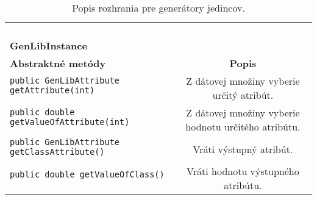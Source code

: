 \begin{table}
\begin{tabular}{|l|c|}
& \\ 
& \\ 
& \\ 
& \\ 
\hline
\hline
\textbf{GenLibInstance} & \\
\hline\hline
\textbf{Abstraktné metódy} & \textbf{Popis} \\
\hline
\verb|public GenLibAttribute getAttribute(int)| & \multirow{2}{5cm}{Z dátovej množiny vyberie určitý atribút.} \\
& \\
\hline
\verb|public double getValueOfAttribute(int)| & \multirow{2}{5cm}{Z dátovej množiny vyberie hodnotu určitého atribútu.} \\
& \\ 
\hline
\verb|public GenLibAttribute getClassAttribute()| & \multirow{2}{5cm}{Vráti výstupný atribút.} \\
& \\ 
\hline
\verb|public double getValueOfClass()| & \multirow{2}{5cm}{Vráti hodnotu výstupného atribútu.} \\
& \\ 
\hline
\hline
\end{tabular}
\caption{Popis rozhrania pre generátory jedincov.}\label{fig:tabnonweka}
\end{table}